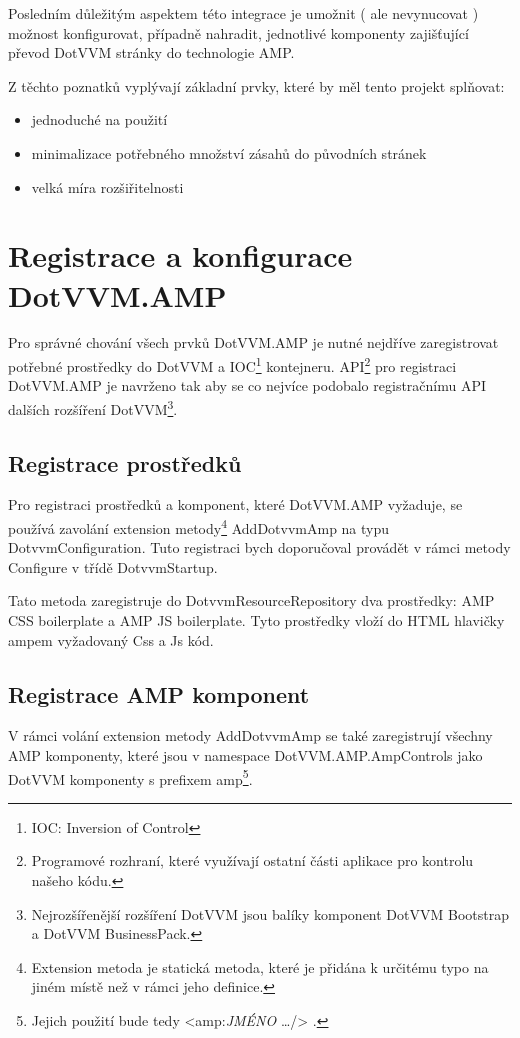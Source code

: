 Posledním důležitým aspektem této integrace je umožnit ( ale nevynucovat ) možnost konfigurovat, případně nahradit, jednotlivé komponenty zajišťující převod DotVVM stránky do technologie AMP.

Z těchto poznatků vyplývají základní prvky, které by měl tento projekt splňovat:

\begin{itemize}
\item jednoduché na použití
\item minimalizace potřebného množství zásahů do původních stránek
\item velká míra rozšiřitelnosti
\end{itemize}
\section{Registrace a konfigurace DotVVM.AMP}
Pro správné chování všech prvků DotVVM.AMP je nutné nejdříve zaregistrovat potřebné prostředky do DotVVM a IOC\footnote{IOC: Inversion of Control} kontejneru. API\footnote{Programové rozhraní, které využívají ostatní části aplikace pro kontrolu našeho kódu.} pro registraci DotVVM.AMP je navrženo tak aby se co nejvíce podobalo registračnímu API dalších rozšíření DotVVM\footnote{Nejrozšířenější rozšíření DotVVM jsou balíky komponent DotVVM Bootstrap a DotVVM BusinessPack.}.

\subsection*{Registrace prostředků}
Pro registraci prostředků a komponent, které DotVVM.AMP vyžaduje, se používá zavolání extension metody\footnote{\label{extension}Extension metoda je statická metoda, které je přidána k určitému typo na jiném místě než v rámci jeho definice.} AddDotvvmAmp na typu DotvvmConfiguration. Tuto registraci bych doporučoval provádět v rámci metody Configure v třídě DotvvmStartup.

Tato metoda zaregistruje do DotvvmResourceRepository dva prostředky: AMP CSS boilerplate a AMP JS boilerplate. Tyto prostředky vloží do HTML hlavičky ampem vyžadovaný Css a Js kód.

\subsection*{Registrace AMP komponent}
V rámci volání extension metody AddDotvvmAmp se také zaregistrují všechny AMP komponenty, které jsou v namespace DotVVM.AMP.AmpControls jako DotVVM komponenty s prefixem amp\footnote{Jejich použití bude tedy <amp:\textit{JMÉNO} \ldots /> . }.

